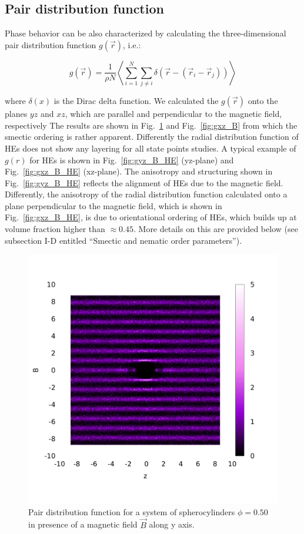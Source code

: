\documentclass[aip,graphicx]{revtex4-1} %
\begin{document}
\subsection{Pair distribution function}

Phase behavior can be also characterized by calculating the three-dimensional pair distribution function $g(\vec{r})$, i.e.:

\begin{equation}
    g(\vec{r}) = \frac{1}{\rho N} \left\langle \sum_{i=1}^N \sum_{j\neq i} \delta \left( \vec{r} - \left( \vec{r}_i - \vec{r}_j \right) \right) \right\rangle
\end{equation}

where $\delta(x)$ is the Dirac delta function. 
We calculated the $g(\vec{r})$ onto the planes $yz$ and $xz$, which are parallel and perpendicular to the magnetic field, respectively
The results are shown in Fig.~\ref{fig:gyz_B} and Fig.~\ref{fig:gxz_B} from which the smectic ordering is rather apparent.
Differently the radial distribution function of HEs does not show any
layering for all state points studies. A typical example of $g(r)$ for HEs is shown in Fig.~\ref{fig:gyz_B_HE} (yz-plane) and 
Fig.~\ref{fig:gxz_B_HE} (xz-plane). The anisotropy and structuring shown in Fig.~\ref{fig:gyz_B_HE} reflects the alignment 
of HEs due to the magnetic field. Differently, the anisotropy
of the radial distribution function calculated onto a plane perpendicular to the magnetic field, which is shown in 
Fig.~\ref{fig:gxz_B_HE}, is due to orientational ordering of HEs, which builds up at volume fraction higher than $\approx 0.45$.  
More details on this are provided below (see subsection I-D entitled ``Smectic and nematic order parameters'').

\begin{figure}
    \begin{center}
    \includegraphics[width=0.5\columnwidth]{gyz_B.png}
    \caption{Pair distribution function for a system of spherocylinders $\phi = 0.50$ in presence of a magnetic field $\vec{B}$ along y axis.}\label{fig:gyz_B}
    \end{center}
\end{figure}
\end{document}
